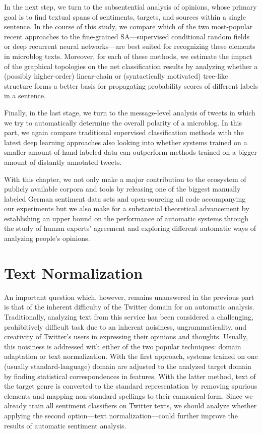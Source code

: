 \documentclass{article}
\begin{document}
In the next step, we turn to the subsentential analysis of opinions,
whose primary goal is to find textual spans of sentiments, targets,
and sources within a single sentence.  In the course of this study, we
compare which of the two most-popular recent approaches to the
fine-grained SA---supervised conditional random fields or deep
recurrent neural networks---are best suited for recognizing these
elements in microblog texts.  Moreover, for each of these methods, we
estimate the impact of the graphical topologies on the net
classification results by analyzing whether a (possibly higher-order)
linear-chain or (syntactically motivated) tree-like structure forms a
better basis for propagating probability scores of different labels in
a sentence.

Finally, in the last stage, we turn to the message-level analysis of
tweets in which we try to automatically determine the overall polarity
of a microblog.  In this part, we again compare traditional supervised
classification methods with the latest deep learning approaches also
looking into whether systems trained on a smaller amount of
hand-labeled data can outperform methods trained on a bigger amount of
distantly annotated tweets.

With this chapter, we not only make a major contribution to the
ecosystem of publicly available corpora and tools by releasing one of
the biggest manually labeled German sentiment data sets and
open-sourcing all code accompanying our experiments but we also make
for a substantial theoretical advancement by establishing an upper
bound on the performance of automatic systems through the study of
human experts' agreement and exploring different automatic ways of
analyzing people's opinions.

\section*{Text Normalization}
An important question which, however, remains unanswered in the
previous part is that of the inherent difficulty of the Twitter domain
for an automatic analysis.  Traditionally, analyzing text from this
service has been considered a challenging, prohibitively difficult
task due to an inherent noisiness, ungrammaticality, and creativity of
Twitter's users in expressing their opinions and thoughts.  Usually,
this noisiness is addressed with either of the two popular techniques:
domain adaptation or text normalization.  With the first approach,
systems trained on one (usually standard-language) domain are adjusted
to the analyzed target domain by finding statistical correspondences
in features.  With the latter method, text of the target genre is
converted to the standard representation by removing spurious elements
and mapping non-standard spellings to their cannonical form.  Since we
already train all sentiment classifiers on Twitter texts, we should
analyze whether applying the second option---text
normalization---could further improve the results of automatic
sentiment analysis.
\end{document}
